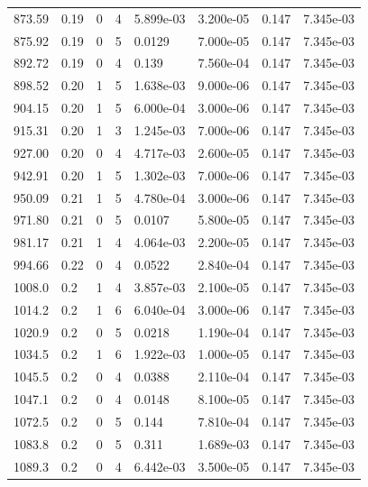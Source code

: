\documentclass[preview]{standalone}
\begin{document}
{{{{\begin{tabular}{L{1.2cm}C{1.2cm} C{0.3cm}C{0.5cm} C{1.4cm}C{1.4cm} C{1.4cm}C{1.4cm}}
  873.59  &  0.19  & 0     &  4 &  5.899e-03  & 3.200e-05  & 0.147 &  7.345e-03   \\ 
  875.92  &  0.19  & 0     &  5 &  0.0129  & 7.000e-05  & 0.147 &  7.345e-03   \\ 
  892.72  &  0.19  & 0     &  4 &  0.139  & 7.560e-04  & 0.147 &  7.345e-03   \\ 
  898.52  &  0.20  & 1     &  5 &  1.638e-03  & 9.000e-06  & 0.147 &  7.345e-03   \\ 
  904.15  &  0.20  & 1     &  5 &  6.000e-04  & 3.000e-06  & 0.147 &  7.345e-03   \\ 
  915.31  &  0.20  & 1     &  3 &  1.245e-03  & 7.000e-06  & 0.147 &  7.345e-03   \\ 
  927.00  &  0.20  & 0     &  4 &  4.717e-03  & 2.600e-05  & 0.147 &  7.345e-03   \\ 
  942.91  &  0.20  & 1     &  5 &  1.302e-03  & 7.000e-06  & 0.147 &  7.345e-03   \\ 
  950.09  &  0.21  & 1     &  5 &  4.780e-04  & 3.000e-06  & 0.147 &  7.345e-03   \\ 
  971.80  &  0.21  & 0     &  5 &  0.0107  & 5.800e-05  & 0.147 &  7.345e-03   \\ 
  981.17  &  0.21  & 1     &  4 &  4.064e-03  & 2.200e-05  & 0.147 &  7.345e-03   \\ 
  994.66  &  0.22  & 0     &  4 &  0.0522  & 2.840e-04  & 0.147 &  7.345e-03   \\ 
  1008.0  &   0.2  & 1     &  4 &  3.857e-03  & 2.100e-05  & 0.147 &  7.345e-03   \\ 
  1014.2  &   0.2  & 1     &  6 &  6.040e-04  & 3.000e-06  & 0.147 &  7.345e-03   \\ 
  1020.9  &   0.2  & 0     &  5 &  0.0218  & 1.190e-04  & 0.147 &  7.345e-03   \\ 
  1034.5  &   0.2  & 1     &  6 &  1.922e-03  & 1.000e-05  & 0.147 &  7.345e-03   \\ 
  1045.5  &   0.2  & 0     &  4 &  0.0388  & 2.110e-04  & 0.147 &  7.345e-03   \\ 
  1047.1  &   0.2  & 0     &  4 &  0.0148  & 8.100e-05  & 0.147 &  7.345e-03   \\ 
  1072.5  &   0.2  & 0     &  5 &  0.144  & 7.810e-04  & 0.147 &  7.345e-03   \\ 
  1083.8  &   0.2  & 0     &  5 &  0.311  & 1.689e-03  & 0.147 &  7.345e-03   \\ 
  1089.3  &   0.2  & 0     &  4 &  6.442e-03  & 3.500e-05  & 0.147 &  7.345e-03   \\ 

\end{tabular}}}}}
\end{document}
